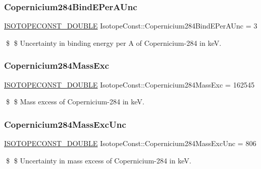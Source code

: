 \subsubsection{\texorpdfstring{Copernicium284\+Bind\+E\+Per\+A\+Unc}{Copernicium284BindEPerAUnc}}
{\footnotesize\ttfamily \mbox{\hyperlink{group___isotope_const-_macros_ga8f45a7272ce02c0b4c65c44636ed719a}{I\+S\+O\+T\+O\+P\+E\+C\+O\+N\+S\+T\+\_\+\+D\+O\+U\+B\+LE}} Isotope\+Const\+::\+Copernicium284\+Bind\+E\+Per\+A\+Unc = 3}

\$ \$ Uncertainty in binding energy per A of Copernicium-\/284 in keV. \mbox{\label{group___isotope_const-_copernicium-_cn284_ga319e6a17324e44ccebec0dd97625c00d}} 
\subsubsection{\texorpdfstring{Copernicium284\+Mass\+Exc}{Copernicium284MassExc}}
{\footnotesize\ttfamily \mbox{\hyperlink{group___isotope_const-_macros_ga8f45a7272ce02c0b4c65c44636ed719a}{I\+S\+O\+T\+O\+P\+E\+C\+O\+N\+S\+T\+\_\+\+D\+O\+U\+B\+LE}} Isotope\+Const\+::\+Copernicium284\+Mass\+Exc = 162545}

\$ \$ Mass excess of Copernicium-\/284 in keV. \mbox{\label{group___isotope_const-_copernicium-_cn284_gafdeb47851cc8bb7e485a447ef4c2fe51}} 
\subsubsection{\texorpdfstring{Copernicium284\+Mass\+Exc\+Unc}{Copernicium284MassExcUnc}}
{\footnotesize\ttfamily \mbox{\hyperlink{group___isotope_const-_macros_ga8f45a7272ce02c0b4c65c44636ed719a}{I\+S\+O\+T\+O\+P\+E\+C\+O\+N\+S\+T\+\_\+\+D\+O\+U\+B\+LE}} Isotope\+Const\+::\+Copernicium284\+Mass\+Exc\+Unc = 806}

\$ \$ Uncertainty in mass excess of Copernicium-\/284 in keV. \mbox{\label{group___isotope_const-_copernicium-_cn284_ga89afa0b427a2159d5a518b698bdea9f7}} 
